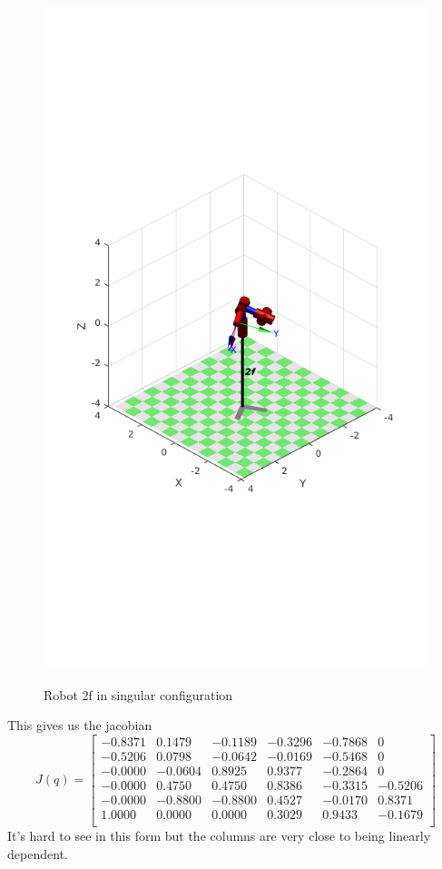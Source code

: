 \documentclass{../homework}
\begin{document}
\begin{solution}
\begin{parts}
\begin{figure}[H]
    \includegraphics[scale=.4]{1-2.png}
    \label{rob2f}
    \caption{Robot 2f in singular configuration}
  \end{figure}
  This gives us the jacobian
  \[
    J(q) =
    \begin{bmatrix}
   -0.8371  & 0.1479 & -0.1189 & -0.3296 & -0.7868 &       0 \\
   -0.5206  & 0.0798 & -0.0642 & -0.0169 & -0.5468 &       0 \\
   -0.0000  &-0.0604 &  0.8925 &  0.9377 & -0.2864 &       0 \\
   -0.0000  & 0.4750 &  0.4750 &  0.8386 & -0.3315 & -0.5206 \\
   -0.0000  &-0.8800 & -0.8800 &  0.4527 & -0.0170 &  0.8371 \\
    1.0000  & 0.0000 &  0.0000 &  0.3029 &  0.9433 & -0.1679 \\
    \end{bmatrix}
  \]
  It's hard to see in this form but the columns are very close to being linearly dependent.
  \end{parts}
\end{solution}
\end{document}
